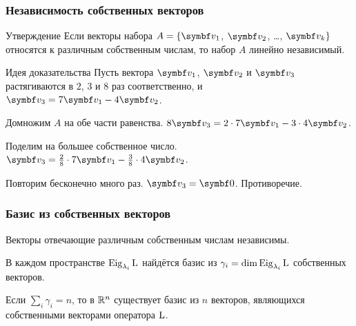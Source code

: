 \begin{frame}
    \frametitle{Независимость собственных векторов}

    \begin{block}{Утверждение}
        Если векторы набора $A = \{\bv_1$, $\bv_2$, \ldots, $\bv_k\}$ относятся к различным
        собственным числам, то набор $A$ линейно независимый.
    \end{block}
    \pause
    \begin{block}{Идея доказательства}
        Пусть вектора $\bv_1$, $\bv_2$ и $\bv_3$ растягиваются в $2$, $3$ и $8$ раз соответственно, 
        и $\bv_3 = 7\bv_1 - 4 \bv_2$.\pause

        Домножим $A$ на обе части равенства. $8\bv_3 = 2 \cdot 7\bv_1 - 3\cdot 4\bv_2$.\pause

        Поделим на большее собственное число. $\bv_3 = \frac{2}{8} \cdot 7\bv_1 - \frac{3}{8}\cdot 4\bv_2$. \pause
        
        Повторим бесконечно много раз. $\bv_3 = \bzero$.
        Противоречие.
        
    \end{block}

    

\end{frame}




\begin{frame}
    \frametitle{Базис из собственных векторов}
    Векторы отвечающие различным собственным числам независимы.
    \pause 

    В каждом пространстве $\operatorname{Eig}_{\lambda_i}\operatorname{L}$ найдётся базис из
     $\gamma_i = \dim \operatorname{Eig}_{\lambda_i}\operatorname{L}$ собственных векторов.
     \pause

    Если $\sum_i \gamma_i = n$, то в $\mathbb{R}^n$ существует базис 
    из $n$ векторов, являющихся собственными векторами оператора $\operatorname{L}$.

\end{frame}


